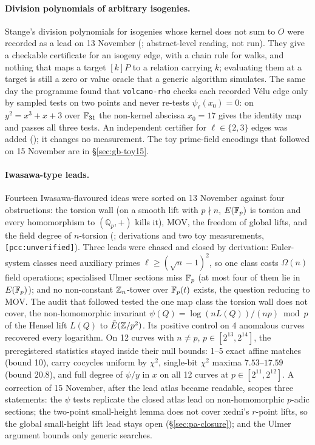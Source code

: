 \paragraph{Division polynomials of arbitrary isogenies.} Stange's division
polynomials for isogenies whose kernel does not sum to $O$ were recorded as
a lead on 13 November (;
abstract-level reading, not run). They give a checkable certificate for an
isogeny edge, with a chain rule for walks, and nothing that maps a target
$[k]P$ to a relation carrying $k$; evaluating them at a target is still a
zero or value oracle that a generic algorithm simulates. The same day the
programme found that \texttt{volcano-rho} checks each recorded V\'elu edge
only by sampled tests on two points and never re-tests $\psi_\ell(x_0)=0$: on
$y^2=x^3+x+3$ over $\mathbb{F}_{31}$ the non-kernel abscissa $x_0=17$ gives the
identity map and passes all three tests. An independent certifier for
$\ell\in\{2,3\}$ edges was added
(); it
changes no measurement. The toy prime-field encodings that followed on 15 November are
in \S\ref{sec:gb-toy15}.

\paragraph{Iwasawa-type leads.} Fourteen Iwasawa-flavoured ideas were sorted
on 13 November against four obstructions: the torsion wall (on a smooth lift
with $p\nmid n$, $E(\mathbb{F}_p)$ is torsion and every homomorphism to
$(\mathbb{Q}_p,+)$ kills it), MOV, the freedom of global lifts, and the field
degree of $n$-torsion (;
derivations and two toy measurements, \texttt{[pcc:unverified]}). Three
leads were chased and closed by derivation: Euler-system classes need
auxiliary primes $\ell\ge(\sqrt n-1)^2$, so one class costs $\Omega(n)$
field operations; specialised Ulmer sections miss $\mathbb{F}_p$ (at most four of
them lie in $E(\mathbb{F}_p)$); and no non-constant $\mathbb{Z}_n$-tower over $\mathbb{F}_p(t)$
exists, the question reducing to MOV. The audit that followed tested the one map class the
torsion wall does not cover, the non-homomorphic invariant
$\psi(Q)=\log(nL(Q))/(np)\bmod p$ of the Hensel lift $L(Q)$ to $\tilde
E(\mathbb{Z}/p^2)$. Its positive control on 4 anomalous curves recovered every
logarithm. On 12 curves with $n\ne p$, $p\in[2^{13},2^{14}]$, the
preregistered statistics stayed inside their null bounds: 1--5 exact affine
matches (bound 10), carry cocycles uniform by $\chi^2$, single-bit $\chi^2$
maxima $7.53$--$17.59$ (bound $20.8$), and full degree of $\psi/y$ in $x$ on
all 12 curves at $p\in[2^{11},2^{12}]$. A correction of 15 November, after
the lead atlas became readable, scopes three statements: the $\psi$ tests
replicate the closed atlas lead on non-homomorphic $p$-adic sections; the
two-point small-height lemma does not cover xedni's $r$-point lifts, so the
global small-height lift lead stays open (\S\ref{sec:pa-closure}); and the
Ulmer argument bounds only generic searches.

